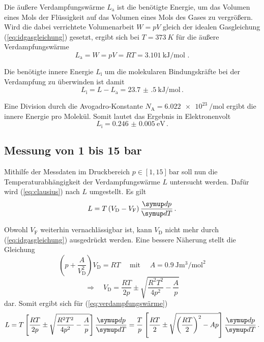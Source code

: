 Die äußere Verdampfungswärme $L_\text{a}$ ist die benötigte Energie, 
um das Volumen eines Mols der Flüssigkeit auf das Volumen eines Mols des Gases zu vergrößern.
Wird die dabei verrichtete Volumenarbeit $W = pV$  gleich der idealen Gasgleichung (\ref{eq:idgasgleichung})
gesetzt, ergibt sich bei $T = \qty{373}{K}$ für die äußere Verdampfungswärme
\begin{equation}
    L_{\text{a}} = W = pV = RT = \qty{3.101}{\kilo\joule\per\mol} \text{ .}
\end{equation}

Die benötigte innere Energie $L_\text{i}$ um die molekularen Bindungskräfte bei der Verdampfung zu überwinden ist damit
\begin{equation}
    L_{\mathrm{i}} = L-L_{\mathrm{a}} = \qty{23.7(5)}{\kilo\joule\per\mol} \, .
\end{equation}

Eine Division durch die Avogadro-Konstante $N_\text{A} = \qty{6.022e23}{\per\mol}$
ergibt die innere Energie pro Molekül. Somit lautet das Ergebnis in Elektronenvolt
\begin{equation}
    L_{\text{i}} = \qty{0.246(5)}{\eV} \, .
\end{equation}


\subsection{Messung von 1 bis 15 bar}

Mithilfe der Messdaten im Druckbereich $p \in [1, 15] \, \mathrm{bar}$ soll nun die Temperaturabhängigkeit
der Verdampfungswärme $L$ untersucht werden. Dafür wird (\ref{eq:clausius}) nach $L$ umgestellt. Es gilt
\begin{equation}
    L = T \left(V_{\text{D}} - V_{\text{F}}\right) \frac {\dif{p}} {\dif{T}} \, . \label{eq:verdampfungswärme}
\end{equation}

Obwohl $V_\text{F}$ weiterhin vernachlässigbar ist, kann $V_\text{D}$ nicht mehr durch (\ref{eq:idgasgleichung})
ausgedrückt werden.
Eine bessere Näherung stellt die Gleichung
\begin{equation}
    \left(p + \frac {A} {V_{\text{D}}^{2}}\right) V_{\text{D}} = RT 
    \quad \text { mit } \quad
    A = \qty[per-mode=fraction]{0.9}{\joule\m\cubed\per\mol\squared} 
\end{equation}
\begin{equation}
    \Rightarrow \quad V_{\text{D}} = \frac{RT}{2p} \pm \sqrt{ \frac {R^{2} T^{2}} {4 p^{2}} - \frac{A}{p} } 
\end{equation}
dar. Somit ergibt sich für (\ref{eq:verdampfungswärme}) 
\begin{equation}
    L = T\left[\frac{R T}{2 p} \pm \sqrt{\frac{R^{2} T^{2}}{4 p^{2}}-\frac{A}{p}}\right] \frac{\dif{p}}{\dif{T}} 
    = \frac{T}{p} \left[\frac{R T}{2} \pm \sqrt{\left(\frac{R T}{2}\right)^{2}-A p}\right] \frac{\dif{p}}{\dif{T}} \, .
    \label{eq:L}
\end{equation}

